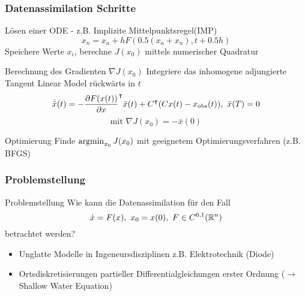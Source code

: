\begin{frame}[<+->]
  \frametitle{Datenassimilation Schritte}
  \begin{block}{Lösen einer ODE - z.B. Implizite Mittelpunktsregel(IMP)}
	\begin{equation}
	 x_n = x_a + h F \left(0.5 (x_a + x_n), t + 0.5 h\right)
	\end{equation}
	Speichere Werte $x_i$, berechne $J(x_0)$ mittels numerischer Quadratur
  \end{block}
  \begin{block}{Berechnung des Gradienten $\nabla J(x_0)$}
	Integriere das inhomogene adjungierte Tangent Linear Model rückwärts in $t$
	\begin{equation}
	  \dot{ \bar{x}}(t) =  -\frac{\partial F(x(t))}{\partial x}^\intercal \bar x(t) +C^\intercal(Cx(t) - x_{\text{obs}}(t)), ~ \bar x(T) =0
	\end{equation}
	\[
	\text{mit }\nabla J(x_0) = -\bar x(0)
	\]
  \end{block}
  \begin{block}{Optimierung}
  Finde $\operatorname{argmin}_{x_0} J(x_0)$ mit geeignetem Optimierungsverfahren (z.B. BFGS)
  \end{block}

\end{frame} 

\begin{frame}[<+->]
  \frametitle{Problemstellung}
  \begin{block}{Problemstellung}
  \centering
	Wie kann die Datenassimilation für den Fall
	\[
	  \dot{x} = F(x),~ x_0 = x(0),~F\in C^{0,1}(\mathbb R^n)
	\]
	betrachtet werden?
  \end{block}
   \begin{itemize}
    \item Unglatte Modelle in Ingeneursdisziplinen z.B. Elektrotechnik (Diode)
    \item Ortsdiskretisierungen partieller Differentialgleichungen erster Ordnung ($\to$ Shallow Water Equation)
   \end{itemize}


\end{frame} 
